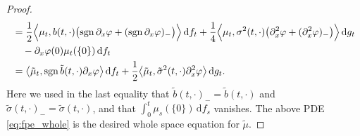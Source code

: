 \documentclass[11pt, a4paper]{article}
\theoremstyle{plain}
\theoremstyle{definition}
\theoremstyle{remark}
\numberwithin{equation}{section}
\DeclareMathOperator{\sgn}{sgn}
\renewcommand{\d}{\mathrm{d}}
\begin{document}
\begin{proof}
\begin{align}
    &= \frac{1}{2} \Bigl\langle \mu_t, b(t, \cdot) \bigl(\sgn \partial_x \varphi + (\sgn \partial_x \varphi)_-\bigr)\Bigr\rangle \, \d f_t + \frac{1}{4} \Bigl\langle \mu_t, \sigma^2(t, \cdot) \bigl(\partial_x^2 \varphi + (\partial_x^2 \varphi)_-\bigr)\Bigr\rangle \, \d g_t \notag \\
    &\ \ \ - \partial_x \varphi(0) \mu_t(\{0\}) \, \d f_t \notag \\
    &= \bigl\langle \tilde{\mu}_t, \sgn \tilde{b}(t, \cdot) \partial_x \varphi\bigr\rangle \, \d f_t + \frac{1}{2} \bigl\langle \tilde{\mu}_t, \tilde{\sigma}^2(t, \cdot) \partial_x^2 \varphi\bigr\rangle \, \d g_t.
\end{align}
Here we used in the last equality that $\tilde{b}(t, \cdot)_- = \tilde{b}(t, \cdot)$ and $\tilde{\sigma}(t, \cdot)_- = \tilde{\sigma}(t, \cdot)$, and that $\int_0^t \mu_s(\{0\}) \, \d f_s$ vanishes. The above PDE \eqref{eq:fpe_whole} is the desired whole space equation for $\tilde{\mu}$. 


\end{proof}
\end{document}
